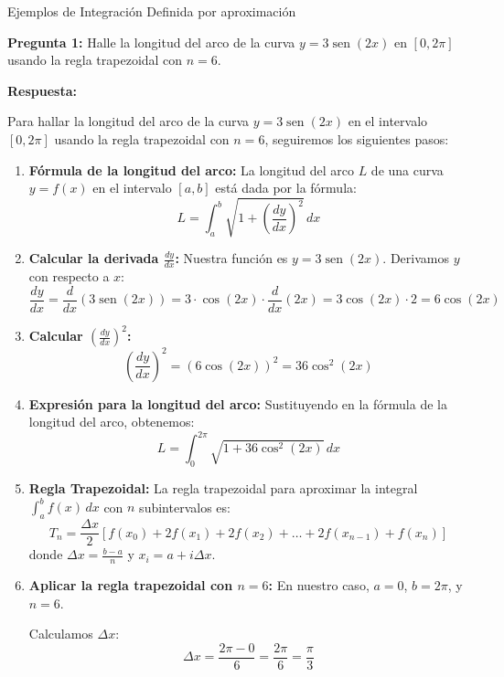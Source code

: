 \documentclass[12pt]{article}
\begin{document}
\begin{center}
    {\Large Ejemplos de Integración Definida por aproximación}
\end{center}

\vspace{1cm}

\textbf{Pregunta 1:} Halle la longitud del arco de la curva $y = 3\operatorname{sen}(2x)$ en $[0, 2\pi]$ usando la regla trapezoidal con $n = 6$.
  
\textbf{Respuesta:}

Para hallar la longitud del arco de la curva $y = 3\operatorname{sen}(2x)$ en el intervalo $[0, 2\pi]$ usando la regla trapezoidal con $n = 6$, seguiremos los siguientes pasos:

\begin{enumerate}
    \item \textbf{Fórmula de la longitud del arco:}
    La longitud del arco $L$ de una curva $y = f(x)$ en el intervalo $[a, b]$ está dada por la fórmula:
    $$L = \int_{a}^{b} \sqrt{1 + \left(\frac{dy}{dx}\right)^2} \, dx$$

    \item \textbf{Calcular la derivada $\frac{dy}{dx}$:}
    Nuestra función es $y = 3\operatorname{sen}(2x)$. Derivamos $y$ con respecto a $x$:
    $$\frac{dy}{dx} = \frac{d}{dx} (3\operatorname{sen}(2x)) = 3 \cdot \cos(2x) \cdot \frac{d}{dx}(2x) = 3 \cos(2x) \cdot 2 = 6\cos(2x)$$

    \item \textbf{Calcular $\left(\frac{dy}{dx}\right)^2$:}
    $$\left(\frac{dy}{dx}\right)^2 = (6\cos(2x))^2 = 36\cos^2(2x)$$

    \item \textbf{Expresión para la longitud del arco:}
    Sustituyendo en la fórmula de la longitud del arco, obtenemos:
    $$L = \int_{0}^{2\pi} \sqrt{1 + 36\cos^2(2x)} \, dx$$

    \item \textbf{Regla Trapezoidal:}
    La regla trapezoidal para aproximar la integral $\int_{a}^{b} f(x) \, dx$ con $n$ subintervalos es:
    $$T_n = \frac{\Delta x}{2} \left[ f(x_0) + 2f(x_1) + 2f(x_2) + \dots + 2f(x_{n-1}) + f(x_n) \right]$$
    donde $\Delta x = \frac{b - a}{n}$ y $x_i = a + i\Delta x$.

    \item \textbf{Aplicar la regla trapezoidal con $n = 6$:}
    En nuestro caso, $a = 0$, $b = 2\pi$, y $n = 6$.

    Calculamos $\Delta x$:
    $$\Delta x = \frac{2\pi - 0}{6} = \frac{2\pi}{6} = \frac{\pi}{3}$$


\end{enumerate}
\end{document}
